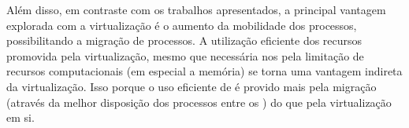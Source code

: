 Além disso, em contraste com os trabalhos apresentados, a principal vantagem explorada com a virtualização é o aumento da mobilidade dos processos, possibilitando a migração de processos. A utilização eficiente dos recursos promovida pela virtualização, mesmo que necessária nos \lws pela limitação de recursos computacionais (em especial a memória) se torna uma vantagem indireta da virtualização. Isso porque o uso eficiente de \hardware é provido mais pela migração (através da melhor disposição dos processos entre os \clusters) do que pela virtualização em si.

